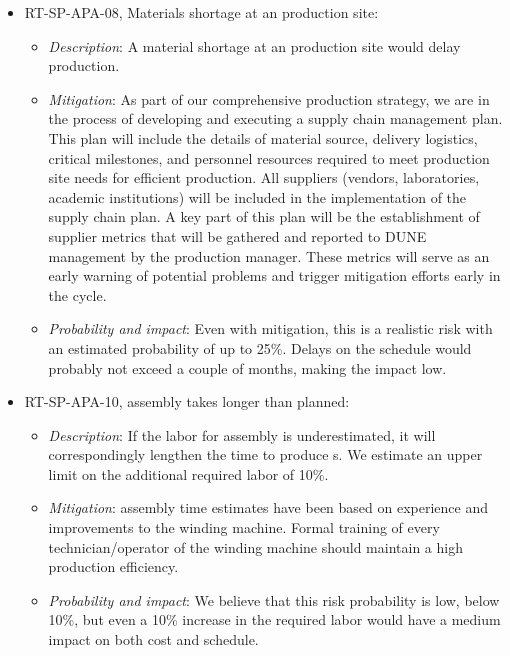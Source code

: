 \begin{itemize}
\item RT-SP-APA-08, Materials shortage at an  production site:
\begin{itemize} %
\item \textit{Description}: A material shortage at an  production site would delay production.
\item \textit{Mitigation}: As part of our comprehensive production strategy, we are in the process of developing and executing a supply chain management plan. This plan will include the details of material source, delivery logistics, critical milestones, and personnel resources required to meet  production site needs for efficient  production. All suppliers (vendors, laboratories, academic institutions) will be included in the implementation of the supply chain plan. A key part of this plan will be the establishment of supplier metrics that will be gathered and reported to DUNE management by the  production manager. These metrics will serve as an early warning of potential problems and trigger mitigation efforts early in the cycle. 
\item \textit{Probability and impact}: Even with mitigation, this is a realistic risk with an estimated probability of up to 25\%. Delays on the schedule would probably not exceed a couple of months, making the impact low.
\end{itemize}

\item RT-SP-APA-10,  assembly takes longer than planned:
\begin{itemize} %
\item \textit{Description}: If the labor for  assembly is underestimated, it will correspondingly lengthen the time to produce s. We estimate an upper limit on the additional required labor of 10\%. 
\item \textit{Mitigation}:  assembly time estimates have been based on  experience and improvements to the winding machine. Formal training of every technician/operator of the winding machine should maintain a high production efficiency. 
\item \textit{Probability and impact}: We believe that this risk probability is low, below 10\%, but even a 10\% increase in the required labor would have a medium impact on both cost and schedule.
\end{itemize}


\end{itemize}
